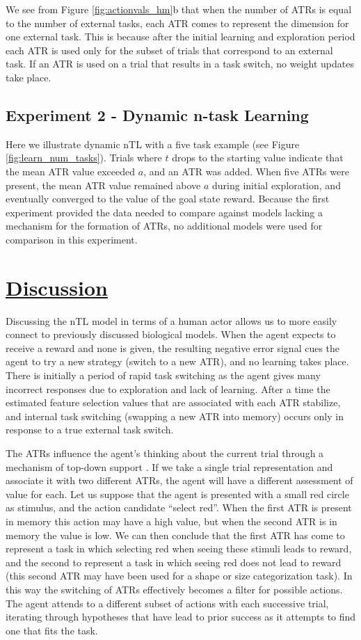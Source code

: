 \documentclass[10pt,letterpaper]{article}
\begin{document}
We see from Figure \ref{fig:actionvals_hm}b that when the number of ATRs is equal to the number of external tasks, each ATR comes to represent the dimension for one external task. This is because after the initial learning and exploration period each ATR is used only for the subset of trials that correspond to an external task. If an ATR is used on a trial that results in a task switch, no weight updates take place.

\subsection{Experiment 2 - Dynamic n-task Learning}

Here we illustrate dynamic nTL with a five task example (see Figure \ref{fig:learn_num_tasks}). Trials where $t$ drops to the starting value indicate that the mean ATR value exceeded $a$, and an ATR was added. When five ATRs were present, the mean ATR value remained above $a$ during initial exploration, and eventually converged to the value of the goal state reward. Because the first experiment provided the data needed to compare against models lacking a mechanism for the formation of ATRs, no additional models were used for comparison in this experiment.

\section{\underline{Discussion}}

Discussing the nTL model in terms of a human actor allows us to more easily connect to previously discussed biological models. When the agent expects to receive a reward and none is given, the resulting negative error signal cues the agent to try a new strategy (switch to a new ATR), and no learning takes place. There is initially a period of rapid task switching as the agent gives many incorrect responses due to exploration and lack of learning. After a time the estimated feature selection values that are associated with each ATR stabilize, and internal task switching (swapping a new ATR into memory) occurs only in response to a true external task switch.

The ATRs influence the agent's thinking about the current trial through a mechanism of top-down support \cite{oreilly_prefrontal_2002}. If we take a single trial representation and associate it with two different ATRs, the agent will have a different assessment of value for each. Let us suppose that the agent is presented with a small red circle as stimulus, and the action candidate ``select red''. When the first ATR is present in memory this action may have a high value, but when the second ATR is in memory the value is low. We can then conclude that the first ATR has come to represent a task in which selecting red when seeing these stimuli leads to reward, and the second to represent a task in which seeing red does not lead to reward (this second ATR may have been used for a shape or size categorization task). In this way the switching of ATRs effectively becomes a filter for possible actions. The agent attends to a different subset of actions with each successive trial, iterating through hypotheses that have lead to prior success as it attempts to find one that fits the task.
\end{document}
